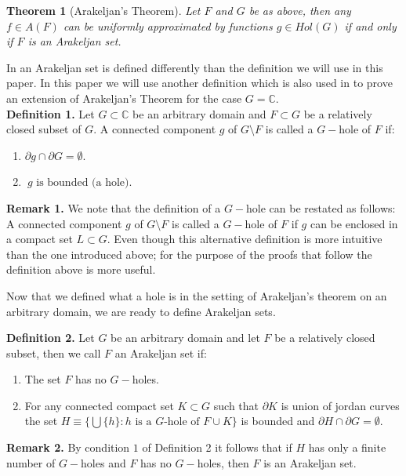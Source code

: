 \documentclass[12pt]{article}
\newtheorem{thm}{Theorem}
\begin{document}
\begin{thm}[Arakeljan's Theorem]
Let $F$ and $G$ be as above, then any $f\in A(F)$ can be uniformly approximated by functions $g\in Hol(G)$ if and only if $F$ is an Arakeljan set.
\end{thm}

\noindent In \cite{GA} an Arakeljan set is defined differently than the definition we will use in this paper. In this paper we will use another definition which is also used in \cite{RU} to prove an extension of Arakeljan's Theorem for the case $G=\mathbb{C}$.\\

\noindent\textbf{Definition 1.}
Let $G\subset \mathbb{C}$ be an arbitrary domain and $F\subset G$ be a relatively closed subset of $G$. A connected component $g$ of $G\setminus F$ is called a $G-$hole of $F$ if: \begin{enumerate}
\item$\partial g\cap \partial G= \emptyset$. 
\item$\ g \text{ is bounded (a hole)}$.
 \end{enumerate}

\noindent\textbf{Remark 1.} We note that the definition of a $G-$hole can be restated as follows: A connected component $g$ of $G\setminus F$ is called a $G-$hole of $F$ if $g$ can be enclosed in a compact set $L\subset G$. Even though this alternative definition is more intuitive than the one introduced above; for the purpose of the proofs that follow the definition above is more useful.\vspace{0.12in}

\noindent Now that we defined what a hole is in the setting of Arakeljan's theorem on an arbitrary domain, we are ready to define Arakeljan sets.\vspace{0.12in}

\noindent\textbf{Definition 2.} Let $G$ be an arbitrary domain and let $F$ be a relatively closed subset, then we call $F$ an Arakeljan set if: \begin{enumerate}
\item The set $F$ has no $G-$holes.
\item For any connected compact set $K\subset G$ such that $\partial K$ is union of jordan curves the set $H\equiv\lbrace \bigcup \lbrace h\rbrace :h \text{ is a $G$-hole of }F\cup K\rbrace$ is bounded and $\partial H\cap \partial G=\emptyset$.
\end{enumerate}

\noindent\textbf{Remark 2.} By condition $1$ of {Definition 2} it follows that if $H$ has only a finite number of $G-$holes and $F$ has no $G-$holes, then $F$ is an Arakeljan set.\vspace{0.12in}
\end{document}
